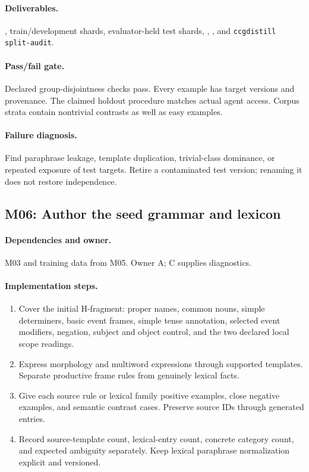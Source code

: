 \documentclass[11pt,a4paper]{article}
\begin{document}
\paragraph{Deliverables.} , train/development shards, evaluator-held test shards, , , and \texttt{ccgdistill split-audit}.

\paragraph{Pass/fail gate.} Declared group-disjointness checks pass. Every example has target versions and provenance. The claimed holdout procedure matches actual agent access. Corpus strata contain nontrivial contrasts as well as easy examples.

\paragraph{Failure diagnosis.} Find paraphrase leakage, template duplication, trivial-class dominance, or repeated exposure of test targets. Retire a contaminated test version; renaming it does not restore independence.

\subsection{M06: Author the seed grammar and lexicon}

\paragraph{Dependencies and owner.} M03 and training data from M05. Owner A; C supplies diagnostics.

\paragraph{Implementation steps.}
\begin{enumerate}
\item Cover the initial H-fragment: proper names, common nouns, simple determiners, basic event frames, simple tense annotation, selected event modifiers, negation, subject and object control, and the two declared local scope readings.
\item Express morphology and multiword expressions through supported templates. Separate productive frame rules from genuinely lexical facts.
\item Give each source rule or lexical family positive examples, close negative examples, and semantic contrast cases. Preserve source IDs through generated entries.
\item Record source-template count, lexical-entry count, concrete category count, and expected ambiguity separately. Keep lexical paraphrase normalization explicit and versioned.
\end{enumerate}
\end{document}
